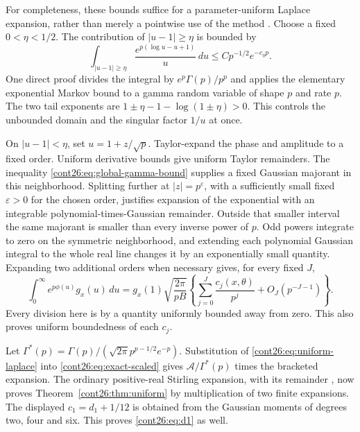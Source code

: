 For completeness, these bounds suffice for a parameter-uniform Laplace
expansion, rather than merely a pointwise use of the method
\cite{DLMF23,TemmeUniform}. Choose a fixed $0<\eta<1/2$.
The contribution of $|u-1|\geq\eta$ is bounded by
\[
 \int_{|u-1|\geq\eta}\frac{e^{p(\log u-u+1)}}u\,du
 \leq C p^{-1/2}e^{-c_\eta p}.
\]
One direct proof divides the integral by
$e^p\Gamma(p)/p^p$ and applies the elementary exponential Markov
bound to a gamma random variable of shape $p$ and rate $p$.
The two tail exponents are
$1\pm\eta-1-\log(1\pm\eta)>0$.
This controls the unbounded domain and the singular factor $1/u$ at once.

On $|u-1|<\eta$, set $u=1+z/\sqrt p$. Taylor-expand the phase and
amplitude to a fixed order. Uniform derivative bounds give uniform
Taylor remainders. The inequality \eqref{cont26:eq:global-gamma-bound} supplies
a fixed Gaussian majorant in this neighborhood. Splitting further at
$|z|=p^\varepsilon$, with a sufficiently small fixed $\varepsilon>0$
for the chosen order, justifies expansion of the exponential with an
integrable polynomial-times-Gaussian remainder. Outside that smaller
interval the same majorant is smaller than every inverse power of $p$.
Odd powers integrate to zero on the symmetric neighborhood, and extending
each polynomial Gaussian integral to the whole real line changes it by
an exponentially small quantity. Expanding two additional orders when
necessary gives, for every fixed $J$,
\begin{equation}\label{cont26:eq:uniform-laplace}
 \int_0^\infty e^{p\phi(u)}g_x(u)\,du
 =g_x(1)\sqrt{\frac{2\pi}{pB}}
   \left\{\sum_{j=0}^J\frac{c_j(x,\theta)}{p^j}
                  +O_J(p^{-J-1})\right\}.
\end{equation}
Every division here is by a quantity uniformly bounded away from zero.
This also proves uniform boundedness of each $c_j$.

Let
$\Gamma^*(p)=\Gamma(p)/(\sqrt{2\pi}p^{p-1/2}e^{-p})$.
Substitution of \eqref{cont26:eq:uniform-laplace} into
\eqref{cont26:eq:exact-scaled} gives $\mathcal A/\Gamma^*(p)$ times the
bracketed expansion. The ordinary positive-real Stirling expansion,
with its remainder \cite{DLMF511}, now proves
Theorem~\ref{cont26:thm:uniform} by multiplication of two finite expansions.
The displayed $c_1=d_1+1/12$ is obtained from the Gaussian moments of
degrees two, four and six. This proves \eqref{cont26:eq:d1} as well.

